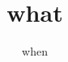 \documentclass[14pt,dvipdfm]{beamer}
\title{what}
\date{when}
\begin{document}
\begin{frame}
 \titlepage
\end{frame}
\end{document}
